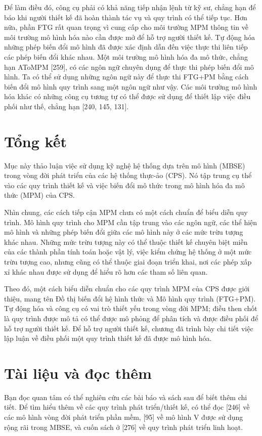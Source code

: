 Để làm điều đó, công cụ phải có khả năng tiếp nhận lệnh từ kỹ sư, chẳng hạn để báo khi người thiết kế đã hoàn thành tác vụ và quy trình có thể tiếp tục. Hơn nữa, phần FTG rất quan trọng vì cung cấp cho môi trường MPM thông tin về môi trường mô hình hóa nào cần được mở để hỗ trợ người thiết kế. Tự động hóa những phép biến đổi mô hình đã được xác định dẫn đến việc thực thi liên tiếp các phép biến đổi khác nhau. Một môi trường mô hình hóa đa mô thức, chẳng hạn AToMPM [259], có các ngôn ngữ chuyên dụng để thực thi phép biến đổi mô hình. Ta có thể sử dụng những ngôn ngữ này để thực thi FTG+PM bằng cách biến đổi mô hình quy trình sang một ngôn ngữ như vậy. Các môi trường mô hình hóa khác có những công cụ tương tự có thể được sử dụng để thiết lập việc điều phối như thế, chẳng hạn [240, 145, 131].

\section{Tổng kết}
Mục này thảo luận việc sử dụng kỹ nghệ hệ thống dựa trên mô hình (MBSE) trong vòng đời phát triển của các hệ thống thực-ảo (CPS). Nó tập trung cụ thể vào các quy trình thiết kế và việc biến đổi mô thức trong mô hình hóa đa mô thức (MPM) của CPS.

Nhìn chung, các cách tiếp cận MPM chưa có một cách chuẩn để biểu diễn quy trình. Mô hình quy trình cho MPM cần tập trung vào các ngôn ngữ, các thể hiện mô hình và những phép biến đổi giữa các mô hình này ở các mức trừu tượng khác nhau. Những mức trừu tượng này có thể thuộc thiết kế chuyên biệt miền của các thành phần tính toán hoặc vật lý, việc kiểm chứng hệ thống ở một mức trừu tượng cao, nhưng cũng có thể thuộc giai đoạn triển khai, nơi các phép xấp xỉ khác nhau được sử dụng để hiểu rõ hơn các tham số liên quan.

Theo đó, một cách biểu diễn chuẩn cho các quy trình MPM của CPS được giới thiệu, mang tên Đồ thị biến đổi hệ hình thức và Mô hình quy trình (FTG+PM). Tự động hóa và công cụ có vai trò thiết yếu trong vòng đời MPM; điều then chốt là quy trình được mô tả có thể được mô phỏng để phân tích và được điều phối để hỗ trợ người thiết kế. Để hỗ trợ người thiết kế, chương đã trình bày chi tiết việc lập luận về điều phối một quy trình thiết kế đã được mô hình hóa.

\section{Tài liệu và đọc thêm}
Bạn đọc quan tâm có thể nghiên cứu các bài báo và sách sau để biết thêm chi tiết. Để tìm hiểu thêm về các quy trình phát triển/thiết kế, có thể đọc [246] về các mô hình vòng đời phát triển phần mềm, [95] về mô hình V được sử dụng rộng rãi trong MBSE, và cuốn sách ở [276] về quy trình phát triển linh hoạt.

